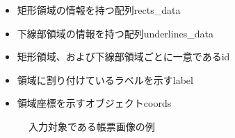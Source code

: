 \begin{itemize}
    \item 矩形領域の情報を持つ配列rects_data
    \item 下線部領域の情報を持つ配列underlines_data
    \item 矩形領域、および下線部領域ごとに一意であるid
    \item 領域に割り付けているラベルを示すlabel
    \item 領域座標を示すオブジェクトcoords
\end{itemize}

\begin{figure}[t]
    \begin{center}
        \caption{入力対象である帳票画像の例}
        \label{fig:original}
    \end{center}
\end{figure}


